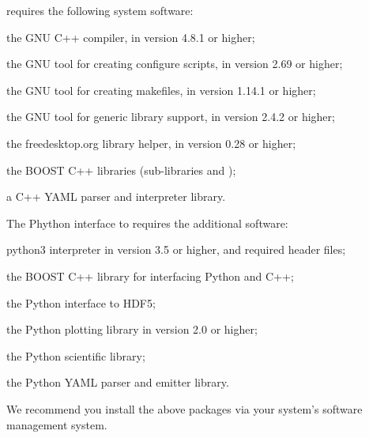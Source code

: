 \EOS requires the following system software:
\begin{description}[labelwidth=.15\textwidth]
    \item[\package{g++}] the GNU C++ compiler, in version 4.8.1 or higher;
    \item[\package{autoconf}] the GNU tool for creating configure scripts, in version 2.69 or higher;
    \item[\package{automake}] the GNU tool for creating makefiles, in version 1.14.1 or higher;
    \item[\package{libtool}] the GNU tool for generic library support, in version 2.4.2 or higher;
    \item[\package{pkg-config}] the freedesktop.org library helper, in version 0.28 or higher;
    \item[\package{BOOST}] the BOOST C++ libraries (sub-libraries  and
            );
    \item[\package{yaml-cpp}] a C++ YAML parser and interpreter library.
\end{description}
The Phython \cite{Python} interface to \EOS requires the additional software:
\begin{description}[labelwidth=.15\textwidth]
    \item[\package{python3}] python3 interpreter in version 3.5 or higher, and required header files;
    \item[\package{BOOST}] the BOOST C++ library  for interfacing Python and C++;
    \item[\package{h5py}] the Python interface to HDF5;
    \item[\package{matplotlib}] the Python plotting library in version 2.0 or higher;
    \item[\package{scipy}] the Python scientific library;
    \item[\package{PyYAML}] the Python YAML parser and emitter library.
\end{description}
We recommend you install the above packages via your system's software management system.\\


